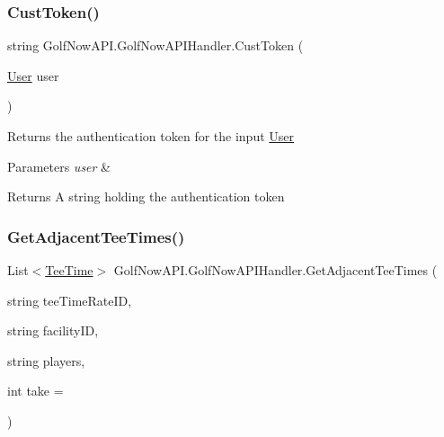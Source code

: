 \subsubsection{\texorpdfstring{CustToken()}{CustToken()}}
{\footnotesize\ttfamily string Golf\+Now\+A\+P\+I.\+Golf\+Now\+A\+P\+I\+Handler.\+Cust\+Token (\begin{DoxyParamCaption}\item[{\mbox{\hyperlink{class_golf_now_a_p_i_1_1_user}{User}}}]{user }\end{DoxyParamCaption})\hspace{0.3cm}{\ttfamily [inline]}}



Returns the authentication token for the input \mbox{\hyperlink{class_golf_now_a_p_i_1_1_user}{User}} 


\begin{DoxyParams}{Parameters}
{\em user} & \\
\hline
\end{DoxyParams}
\begin{DoxyReturn}{Returns}
A string holding the authentication token
\end{DoxyReturn}
\mbox{\label{class_golf_now_a_p_i_1_1_golf_now_a_p_i_handler_a851716215095e024dee5add6c861cb4a}} 
\subsubsection{\texorpdfstring{GetAdjacentTeeTimes()}{GetAdjacentTeeTimes()}}
{\footnotesize\ttfamily List$<$\mbox{\hyperlink{class_golf_now_a_p_i_1_1_tee_time}{Tee\+Time}}$>$ Golf\+Now\+A\+P\+I.\+Golf\+Now\+A\+P\+I\+Handler.\+Get\+Adjacent\+Tee\+Times (\begin{DoxyParamCaption}\item[{string}]{tee\+Time\+Rate\+ID,  }\item[{string}]{facility\+ID,  }\item[{string}]{players,  }\item[{int}]{take = {} }\end{DoxyParamCaption})\hspace{0.3cm}{\ttfamily [inline]}}



